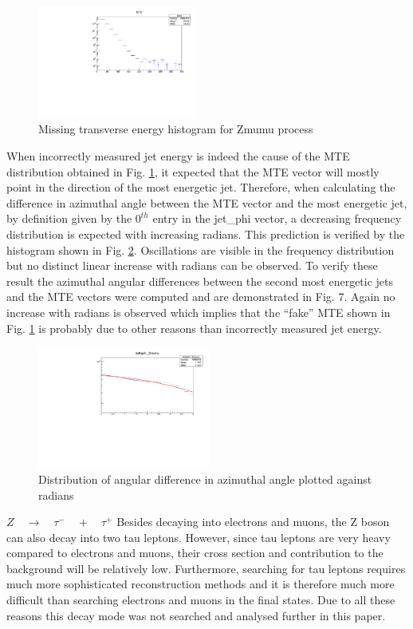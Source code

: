 \documentclass[runningheads,a4paper]{llncs}
\begin{document}
\begin{figure}
\centering
\includegraphics[height=3.7cm]{MTE_Zmumu_new}
\caption{Missing transverse energy histogram for Zmumu process}
\label{fig:mtezmumu}
\end{figure}

When incorrectly measured jet energy is indeed the cause of the MTE distribution obtained in Fig. \ref{fig:mtezmumu}, it expected that the MTE vector will mostly point in the  direction of the most energetic jet. Therefore, when calculating the difference in azimuthal angle between the MTE vector and the most energetic jet, by definition given by the ${0}^{th}$ entry in the jet\_phi vector, a decreasing frequency distribution is expected with increasing radians. This prediction is verified by the histogram shown in Fig. \ref{fig:deltaphizmumu}. Oscillations are visible in the frequency distribution but no distinct linear increase with radians can be observed. To verify these result the azimuthal angular differences between the second most energetic jets and the MTE vectors were computed and are demonstrated in Fig. 7. Again no increase with radians is observed which implies that the “fake” MTE shown in Fig. \ref{fig:mtezmumu} is probably due to other reasons than incorrectly measured jet energy.

\begin{figure}
\centering
\includegraphics[height=4cm]{deltaphi_jet0_met_Zmumu_fit}
\caption{Distribution of angular difference in azimuthal angle plotted against radians}
\label{fig:deltaphizmumu}
\end{figure}

$Z\quad \rightarrow \quad \tau ^{ - }\quad +\quad { \tau  }^{ + }$
\bigbreak
Besides decaying into electrons and muons, the Z boson can also decay into two tau leptons. However, since tau leptons are very heavy compared to electrons and muons, their cross section and contribution to the background will be relatively low. Furthermore, searching for tau leptons requires much more sophisticated reconstruction methods and it is therefore much more difficult than searching electrons and muons in the final states. Due to all these reasons this decay mode was not searched and analysed further in this paper.
\end{document}
